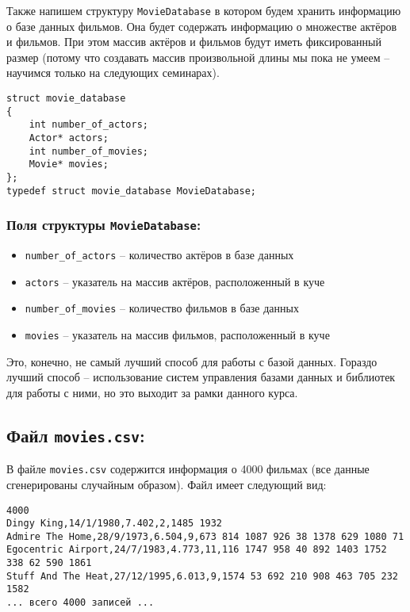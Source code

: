 \documentclass{article}
\begin{document}
Также напишем структуру \texttt{MovieDatabase} в котором будем хранить информацию о базе данных фильмов. Она будет содержать информацию о множестве актёров и фильмов. При этом массив актёров и фильмов будут иметь фиксированный размер (потому что создавать массив произвольной длины мы пока не умеем -- научимся только на следующих семинарах).
\begin{lstlisting}
struct movie_database 
{
    int number_of_actors;
    Actor* actors;
    int number_of_movies;
    Movie* movies; 
};
typedef struct movie_database MovieDatabase;
\end{lstlisting}

\subsubsection*{Поля структуры \texttt{MovieDatabase}:}
\begin{itemize}
\item \texttt{number\_of\_actors} -- количество актёров в базе данных
\item \texttt{actors} -- указатель на массив актёров, расположенный в куче
\item \texttt{number\_of\_movies} -- количество фильмов в базе данных
\item \texttt{movies} -- указатель на массив фильмов, расположенный в куче
\end{itemize}

Это, конечно, не самый лучший способ для работы с базой данных. Гораздо лучший способ -- использование систем управления базами данных и библиотек для работы с ними, но это выходит за рамки данного курса.

\subsection*{Файл \texttt{movies.csv}:}
В файле \texttt{movies.csv} содержится информация о 4000 фильмах (все данные сгенерированы случайным образом). Файл имеет следующий вид:
\begin{verbatim}
4000
Dingy King,14/1/1980,7.402,2,1485 1932
Admire The Home,28/9/1973,6.504,9,673 814 1087 926 38 1378 629 1080 71
Egocentric Airport,24/7/1983,4.773,11,116 1747 958 40 892 1403 1752 338 62 590 1861
Stuff And The Heat,27/12/1995,6.013,9,1574 53 692 210 908 463 705 232 1582
... всего 4000 записей ...
\end{verbatim}

\newpage
\end{document}
